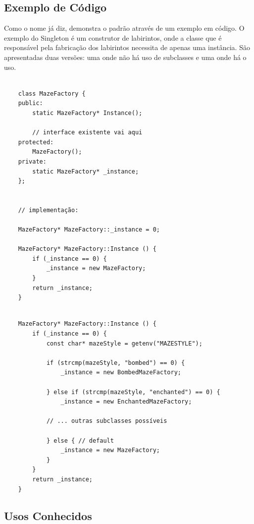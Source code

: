 \subsection*{Exemplo de Código}

Como o nome já diz, demonstra o padrão através de 
um exemplo em código. O exemplo do Singleton é um 
construtor de labirintos, onde a classe que é 
responsável pela fabricação dos labirintos necessita 
de apenas uma instância. São apresentadas duas versões: 
uma onde não há uso de subclasses e uma onde há o 
uso.

\begin{lstlisting}[caption={Exemplo de Singleton sem subclasses}, label=singletonnosub]
    
    class MazeFactory {
    public:
        static MazeFactory* Instance();

        // interface existente vai aqui
    protected:
        MazeFactory();
    private:
        static MazeFactory* _instance;
    };


    // implementação:

    MazeFactory* MazeFactory::_instance = 0;

    MazeFactory* MazeFactory::Instance () {
        if (_instance == 0) {
            _instance = new MazeFactory;
        } 
        return _instance;
    } 

\end{lstlisting}


\begin{lstlisting}[caption={Exemplo de Singleton com subclasses},label=singletonsub]
    
    MazeFactory* MazeFactory::Instance () {
        if (_instance == 0) {
            const char* mazeStyle = getenv("MAZESTYLE");

            if (strcmp(mazeStyle, "bombed") == 0) {
                _instance = new BombedMazeFactory;

            } else if (strcmp(mazeStyle, "enchanted") == 0) {
                _instance = new EnchantedMazeFactory;

            // ... outras subclasses possíveis

            } else { // default
                _instance = new MazeFactory;
            }
        }
        return _instance;
    } 

\end{lstlisting}


\subsection*{Usos Conhecidos}

